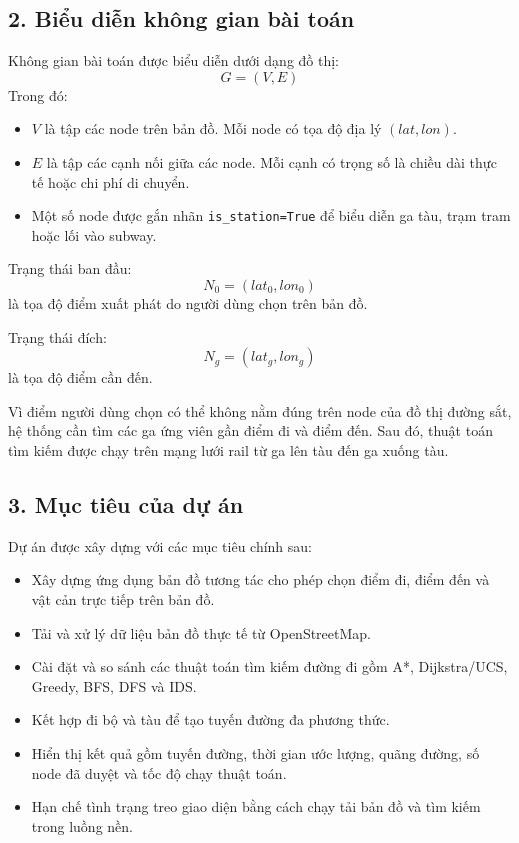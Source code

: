 \documentclass[12pt,a4paper]{article}
\begin{document}
\subsection*{2. Biểu diễn không gian bài toán}

Không gian bài toán được biểu diễn dưới dạng đồ thị:
\[
G=(V,E)
\]
Trong đó:
\begin{itemize}
    \item $V$ là tập các node trên bản đồ. Mỗi node có tọa độ địa lý $(lat, lon)$.
    \item $E$ là tập các cạnh nối giữa các node. Mỗi cạnh có trọng số là chiều dài thực tế hoặc chi phí di chuyển.
    \item Một số node được gắn nhãn \texttt{is\_station=True} để biểu diễn ga tàu, trạm tram hoặc lối vào subway.
\end{itemize}

Trạng thái ban đầu:
\[
N_0 = (lat_0, lon_0)
\]
là tọa độ điểm xuất phát do người dùng chọn trên bản đồ.

Trạng thái đích:
\[
N_g = (lat_g, lon_g)
\]
là tọa độ điểm cần đến.

Vì điểm người dùng chọn có thể không nằm đúng trên node của đồ thị đường sắt, hệ thống cần tìm các ga ứng viên gần điểm đi và điểm đến. Sau đó, thuật toán tìm kiếm được chạy trên mạng lưới rail từ ga lên tàu đến ga xuống tàu.

\subsection*{3. Mục tiêu của dự án}

Dự án được xây dựng với các mục tiêu chính sau:
\begin{itemize}
    \item Xây dựng ứng dụng bản đồ tương tác cho phép chọn điểm đi, điểm đến và vật cản trực tiếp trên bản đồ.
    \item Tải và xử lý dữ liệu bản đồ thực tế từ OpenStreetMap.
    \item Cài đặt và so sánh các thuật toán tìm kiếm đường đi gồm A*, Dijkstra/UCS, Greedy, BFS, DFS và IDS.
    \item Kết hợp đi bộ và tàu để tạo tuyến đường đa phương thức.
    \item Hiển thị kết quả gồm tuyến đường, thời gian ước lượng, quãng đường, số node đã duyệt và tốc độ chạy thuật toán.
    \item Hạn chế tình trạng treo giao diện bằng cách chạy tải bản đồ và tìm kiếm trong luồng nền.
\end{itemize}
\end{document}
